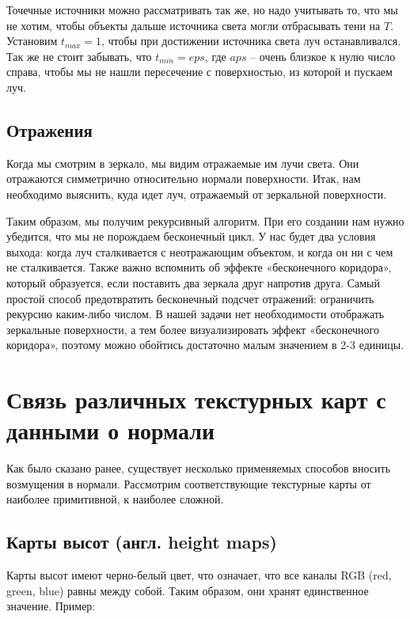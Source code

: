 Точечные источники можно рассматривать так же, но надо учитывать то, что мы не хотим, чтобы объекты дальше источника света могли отбрасывать тени на $T$. Установим $t_{max} = 1$, чтобы при достижении источника света луч останавливался. Так же не стоит забывать, что $t_{min} = eps$, где $aps$ – очень близкое к нулю число справа, чтобы мы не нашли пересечение с поверхностью, из которой и пускаем луч.

\subsection{Отражения}

Когда мы смотрим в зеркало, мы видим отражаемые им лучи света. Они отражаются симметрично относительно нормали поверхности. Итак, нам необходимо выяснить, куда идет луч, отражаемый от зеркальной поверхности.

Таким образом, мы получим рекурсивный алгоритм. При его создании нам нужно убедится, что мы не порождаем бесконечный цикл. У нас будет два условия выхода: когда луч сталкивается с неотражающим объектом, и когда он ни с чем не сталкивается. Также важно вспомнить об эффекте «бесконечного коридора», который образуется, если поставить два зеркала друг напротив друга. Самый простой способ предотвратить бесконечный подсчет отражений: ограничить рекурсию каким-либо числом. В нашей задачи нет необходимости отображать зеркальные поверхности, а тем более визуализировать эффект «бесконечного коридора», поэтому можно обойтись достаточно малым значением в 2-3 единицы.

\section{Связь различных текстурных карт с данными о нормали}

Как было сказано ранее, существует несколько применяемых способов
вносить возмущения в нормали. Рассмотрим соответствующие текстурные
карты от наиболее примитивной, к наиболее сложной.

\subsection{Карты высот (англ. height maps)}

Карты высот имеют черно-белый цвет, что означает, что все каналы RGB (red, green, blue) равны между собой. Таким образом, они хранят единственное значение. Пример:

